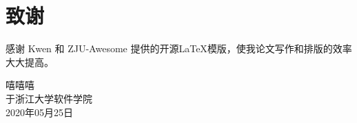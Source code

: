 \chapter{致谢}

感谢 Kwen 和 ZJU-Awesome 提供的开源{\LaTeX}模版，使我论文写作和排版的效率大大提高。

 \vspace{8cm}
 \hfill
 \begin{minipage}{14em}
     \begin{flushright}
         嘻嘻嘻\\
         于浙江大学软件学院 \\ %
         2020年05月25日\\
     \end{flushright}
 \end{minipage}


